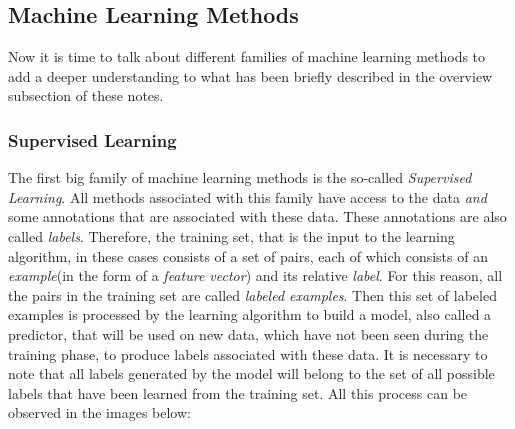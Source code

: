 \subsection{Machine Learning Methods}

Now it is time to talk about different families of machine learning
methods to add a deeper understanding to what has been briefly
described in the overview subsection of these notes.

\subsubsection{Supervised Learning}

The first big family of machine learning methods is the so-called
\emph{Supervised Learning}. All methods associated with this family
have access to the data \emph{and} some annotations that are
associated with these data. These annotations are also called
\emph{labels}. Therefore, the training set, that is the input to the
learning algorithm, in these cases consists of a set of pairs, each of
which consists of an \emph{example}(in the form of a
\emph{feature vector}) and its relative \emph{label}. For this reason,
all the pairs in the training set are called \emph{labeled examples}.
Then this set of labeled examples is processed by the learning
algorithm to build a model, also called a predictor, that will be used
on new data, which have not been seen during the training phase, to
produce labels associated with these data. It is necessary to note that
all labels generated by the model will belong to the set of all possible
labels that have been learned from the training set. All this process
can be observed in the images below:

\newpage

